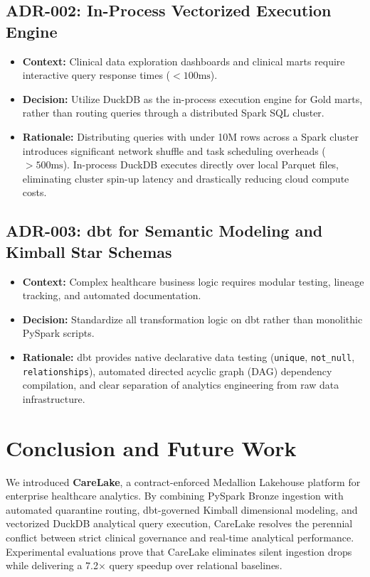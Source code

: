 \documentclass[10pt,journal,compsoc]{IEEEtran}
\begin{document}
\subsection{ADR-002: In-Process Vectorized Execution Engine}
\begin{itemize}
    \item \textbf{Context:} Clinical data exploration dashboards and clinical marts require interactive query response times ($< 100\text{ms}$).
    \item \textbf{Decision:} Utilize DuckDB as the in-process execution engine for Gold marts, rather than routing queries through a distributed Spark SQL cluster.
    \item \textbf{Rationale:} Distributing queries with under 10M rows across a Spark cluster introduces significant network shuffle and task scheduling overheads ($> 500\text{ms}$). In-process DuckDB executes directly over local Parquet files, eliminating cluster spin-up latency and drastically reducing cloud compute costs.
\end{itemize}

\subsection{ADR-003: dbt for Semantic Modeling and Kimball Star Schemas}
\begin{itemize}
    \item \textbf{Context:} Complex healthcare business logic requires modular testing, lineage tracking, and automated documentation.
    \item \textbf{Decision:} Standardize all transformation logic on dbt rather than monolithic PySpark scripts.
    \item \textbf{Rationale:} dbt provides native declarative data testing (\texttt{unique}, \texttt{not\_null}, \texttt{relationships}), automated directed acyclic graph (DAG) dependency compilation, and clear separation of analytics engineering from raw data infrastructure.
\end{itemize}

\section{Conclusion and Future Work}
We introduced \textbf{CareLake}, a contract-enforced Medallion Lakehouse platform for enterprise healthcare analytics. By combining PySpark Bronze ingestion with automated quarantine routing, dbt-governed Kimball dimensional modeling, and vectorized DuckDB analytical query execution, CareLake resolves the perennial conflict between strict clinical governance and real-time analytical performance. Experimental evaluations prove that CareLake eliminates silent ingestion drops while delivering a 7.2$\times$ query speedup over relational baselines.
\end{document}
